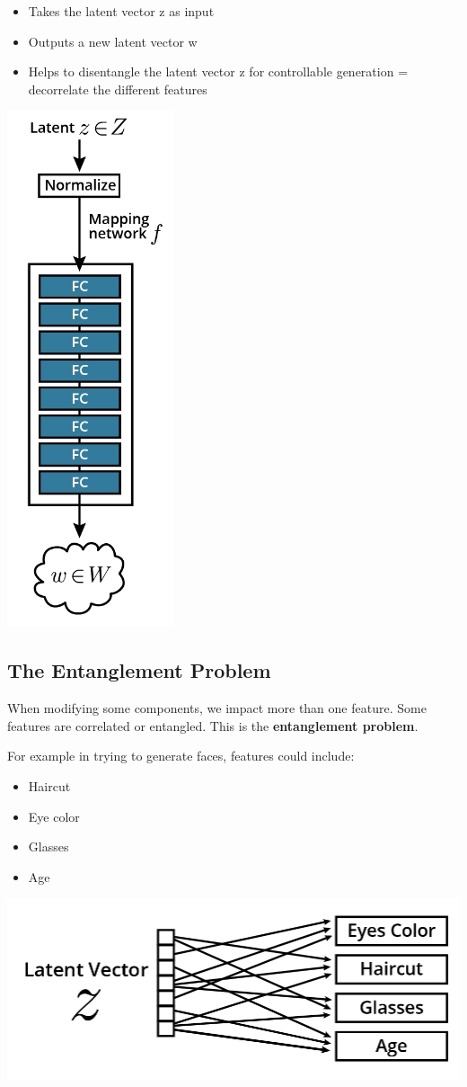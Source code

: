 \begin{itemize}
    \item Takes the latent vector z as input
    \item Outputs a new latent vector w
    \item Helps to disentangle the latent vector z for controllable generation = decorrelate the different features
\end{itemize}

\includegraphics[width=0.25\linewidth]{img//genAdvNet//modernGAN/screen-shot-2022-06-30-at-4.46.39-pm.jpeg}

\subsection{The Entanglement Problem}
When modifying some components, we impact more than one feature. Some features are correlated or entangled. This is the \textbf{entanglement problem}. \newline

For example in trying to generate faces, features could include:
\begin{itemize}
    \item Haircut
    \item Eye color
    \item Glasses
    \item Age
\end{itemize}

\includegraphics[width=0.5\linewidth]{img//genAdvNet//modernGAN/screen-shot-2022-06-30-at-4.46.56-pm.jpeg}

